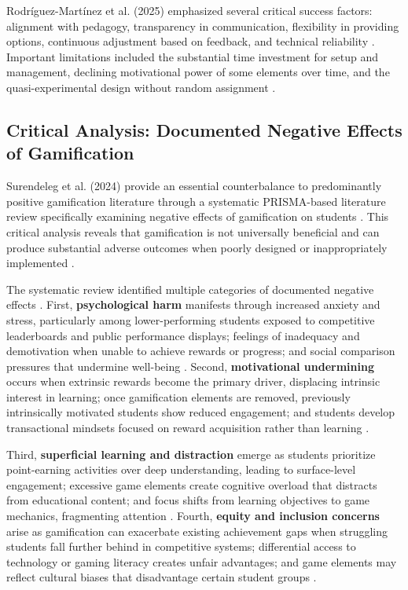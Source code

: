 \documentclass[12pt,a4paper]{article}
\begin{document}
Rodríguez-Martínez et al. (2025) emphasized several critical success factors: alignment with pedagogy, transparency in communication, flexibility in providing options, continuous adjustment based on feedback, and technical reliability \parencite{rodriguez2025}. Important limitations included the substantial time investment for setup and management, declining motivational power of some elements over time, and the quasi-experimental design without random assignment \parencite{rodriguez2025}.


\subsection{Critical Analysis: Documented Negative Effects of Gamification}

Surendeleg et al. (2024) provide an essential counterbalance to predominantly positive gamification literature through a systematic PRISMA-based literature review specifically examining negative effects of gamification on students \parencite{surendeleg2024}. This critical analysis reveals that gamification is not universally beneficial and can produce substantial adverse outcomes when poorly designed or inappropriately implemented \parencite{surendeleg2024}.

The systematic review identified multiple categories of documented negative effects \parencite{surendeleg2024}. First, \textbf{psychological harm} manifests through increased anxiety and stress, particularly among lower-performing students exposed to competitive leaderboards and public performance displays; feelings of inadequacy and demotivation when unable to achieve rewards or progress; and social comparison pressures that undermine well-being \parencite{surendeleg2024}. Second, \textbf{motivational undermining} occurs when extrinsic rewards become the primary driver, displacing intrinsic interest in learning; once gamification elements are removed, previously intrinsically motivated students show reduced engagement; and students develop transactional mindsets focused on reward acquisition rather than learning \parencite{surendeleg2024}.

Third, \textbf{superficial learning and distraction} emerge as students prioritize point-earning activities over deep understanding, leading to surface-level engagement; excessive game elements create cognitive overload that distracts from educational content; and focus shifts from learning objectives to game mechanics, fragmenting attention \parencite{surendeleg2024}. Fourth, \textbf{equity and inclusion concerns} arise as gamification can exacerbate existing achievement gaps when struggling students fall further behind in competitive systems; differential access to technology or gaming literacy creates unfair advantages; and game elements may reflect cultural biases that disadvantage certain student groups \parencite{surendeleg2024}.
\end{document}
